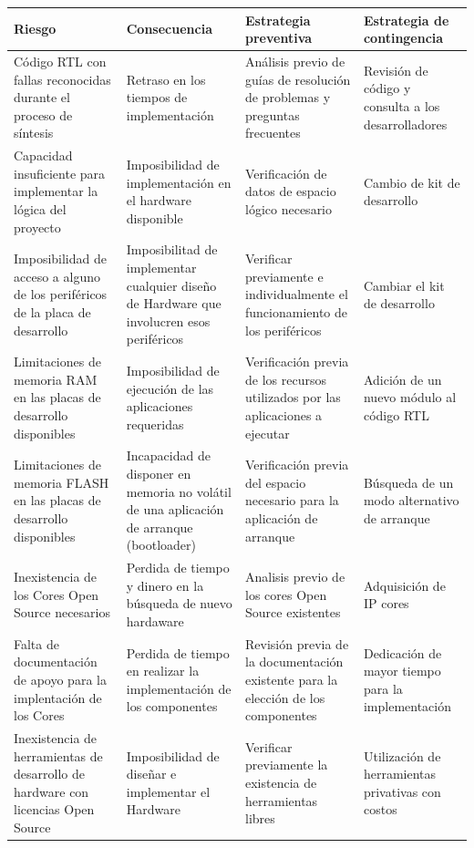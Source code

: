			
\begin{table}[!h]
		\centering
		\begin{tabular}{ p{2.5cm} p{9cm} p{2cm} p{2cm} }
		\hline 
		\rowcolor[gray]{0.8} Riesgo & Consecuencia & Estrategia preventiva & Estrategia de contingencia\\
		\hline
		Código RTL con fallas reconocidas durante el proceso de síntesis& Retraso en los tiempos de implementación & Análisis previo de guías de resolución de problemas y preguntas frecuentes & Revisión de código y consulta a los desarrolladores \\
		\hline
		 Capacidad insuficiente para implementar la lógica del proyecto & Imposibilidad de implementación en el hardware disponible  & Verificación de datos de espacio lógico necesario  & Cambio de kit de desarrollo\\	 
		\hline
		 Imposibilidad de acceso a alguno de los periféricos de la placa de desarrollo & Imposibilitad de implementar cualquier diseño de Hardware que involucren esos periféricos& Verificar previamente e individualmente el funcionamiento de los periféricos & Cambiar el kit de desarrollo\\
		\hline
		Limitaciones de memoria RAM en las placas de desarrollo disponibles& Imposibilidad de ejecución de las aplicaciones requeridas & Verificación previa de los recursos utilizados por las aplicaciones a ejecutar & Adición de un nuevo módulo al código RTL  \\	 
		\hline
		Limitaciones de memoria FLASH en las placas de desarrollo disponibles& Incapacidad de disponer en memoria no volátil de una aplicación de arranque (bootloader) & Verificación previa del espacio necesario para la aplicación de arranque & Búsqueda de un modo alternativo de arranque\\ 
		\hline
		Inexistencia de los Cores Open Source necesarios& Perdida de tiempo y dinero en la búsqueda de nuevo hardaware& Analisis previo de los cores Open Source existentes & Adquisición de IP cores\\
		\hline
		Falta de documentación de apoyo para la implentación de los Cores & Perdida de tiempo en realizar la implementación de los componentes & Revisión previa de la documentación existente para la elección de los  componentes & Dedicación de mayor tiempo para la implementación\\ 
		\hline
		 Inexistencia de herramientas de desarrollo de hardware con licencias Open Source & Imposibilidad de diseñar e implementar el Hardware & Verificar previamente la existencia de herramientas libres & Utilización de herramientas privativas con costos\\

\end{tabular}
\end{table}
